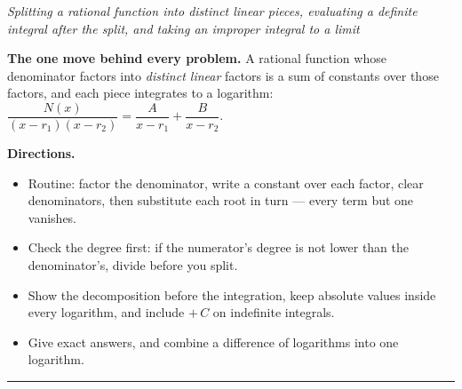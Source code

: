 \documentclass[12pt]{article}
\begin{document}

\begin{center}\small\textit{Splitting a rational function into distinct linear
pieces, evaluating a definite integral after the split, and taking an improper
integral to a limit}\end{center}

\noindent\textbf{The one move behind every problem.} A rational function whose
denominator factors into \emph{distinct linear} factors is a sum of constants
over those factors, and each piece integrates to a logarithm:
$\dfrac{N(x)}{(x-r_1)(x-r_2)} = \dfrac{A}{x-r_1} + \dfrac{B}{x-r_2}$.

\noindent\textbf{Directions.}
\begin{itemize}[leftmargin=1.0cm, itemsep=1pt, topsep=2pt]
\item Routine: factor the denominator, write a constant over each factor, clear
denominators, then substitute each root in turn --- every term but one vanishes.
\item Check the degree first: if the numerator's degree is not lower than the
denominator's, divide before you split.
\item Show the decomposition before the integration, keep absolute values
inside every logarithm, and include $+\,C$ on indefinite integrals.
\item Give exact answers, and combine a difference of logarithms into one
logarithm.
\end{itemize}
\noindent\rule{\linewidth}{0.4pt}



\end{document}
